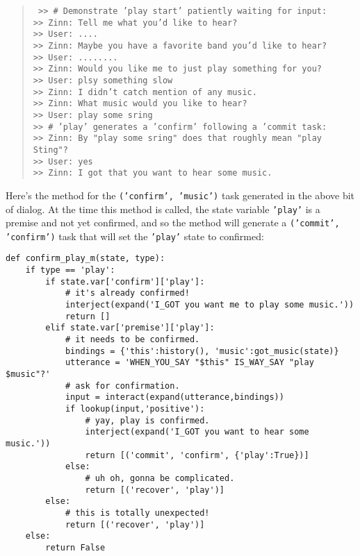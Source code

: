 \documentclass[letterpaper,11pt]{article}
\begin{document}
\begin{quotation} \tt
%
  \noindent
  >> \# Demonstrate 'play start' patiently waiting for input:\\
  >> Zinn: Tell me what you'd like to hear?\\
  >> User: ....\\
  >> Zinn: Maybe you have a favorite band you'd like to hear?\\
  >> User: ........\\
  >> Zinn: Would you like me to just play something for you?\\
  >> User: plsy something slow\\
  >> Zinn: I didn't catch mention of any music.\\
  >> Zinn: What music would you like to hear?\\
  >> User: play some sring\\
  >> \# 'play' generates a 'confirm' following a 'commit task:\\
  >> Zinn: By "play some sring" does that roughly mean "play Sting"?\\
  >> User: yes\\
  >> Zinn: I got that you want to hear some music.\\
%
\end{quotation}
%
Here's the method for the {\tt{('confirm', 'music')}} task generated in the above bit of dialog. At the time this method is called, the state variable {\tt{'play'}} is a premise and not yet confirmed, and so the method will generate a {\tt{('commit', 'confirm')}} task that will set the {\tt{'play'}} state to confirmed: 
%
\begin{verbatim}
def confirm_play_m(state, type):
    if type == 'play':
        if state.var['confirm']['play']:
            # it's already confirmed!
            interject(expand('I_GOT you want me to play some music.'))
            return []
        elif state.var['premise']['play']:
            # it needs to be confirmed.
            bindings = {'this':history(), 'music':got_music(state)}
            utterance = 'WHEN_YOU_SAY "$this" IS_WAY_SAY "play $music"?'
            # ask for confirmation.
            input = interact(expand(utterance,bindings))
            if lookup(input,'positive'):
                # yay, play is confirmed.
                interject(expand('I_GOT you want to hear some music.'))
                return [('commit', 'confirm', {'play':True})]
            else:
                # uh oh, gonna be complicated.
                return [('recover', 'play')]
        else:
            # this is totally unexpected!
            return [('recover', 'play')]
    else:
        return False
\end{verbatim}
\end{document}

